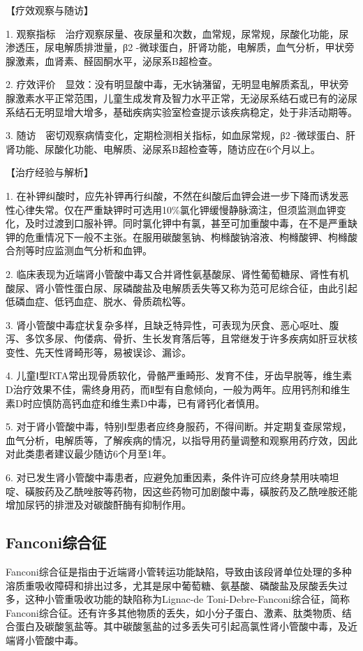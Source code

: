 【疗效观察与随访】

1.
观察指标　治疗观察尿量、夜尿量和次数，血常规，尿常规，尿酸化功能，尿渗透压，尿电解质排泄量，β{2}
-微球蛋白，肝肾功能，电解质，血气分析，甲状旁腺激素，血肾素、醛固酮水平，泌尿系B超检查。

2.
疗效评价　显效：没有明显酸中毒，无水钠潴留，无明显电解质紊乱，甲状旁腺激素水平正常范围，儿童生成发育及智力水平正常，无泌尿系结石或已有的泌尿系结石无明显增大增多，基础疾病实验室检查提示该疾病稳定，处于非活动期等。

3. 随访　密切观察病情变化，定期检测相关指标，如血尿常规，β{2}
-微球蛋白、肝肾功能、尿酸化功能、电解质、泌尿系B超检查等，随访应在6个月以上。

【治疗经验与解析】

1.
在补钾纠酸时，应先补钾再行纠酸，不然在纠酸后血钾会进一步下降而诱发恶性心律失常。仅在严重缺钾时可选用10\%氯化钾缓慢静脉滴注，但须监测血钾变化，及时过渡到口服补钾。同时氯化钾中有氯，甚至可加重酸中毒，在不是严重缺钾的危重情况下一般不主张。在服用碳酸氢钠、枸橼酸钠溶液、枸橼酸钾、枸橼酸合剂等时应监测血气分析和血钾。

2.
临床表现为近端肾小管酸中毒又合并肾性氨基酸尿、肾性葡萄糖尿、肾性有机酸尿、肾小管性蛋白尿、尿磷酸盐及电解质丢失等又称为范可尼综合征，由此引起低磷血症、低钙血症、脱水、骨质疏松等。

3.
肾小管酸中毒症状复杂多样，且缺乏特异性，可表现为厌食、恶心呕吐、腹泻、多饮多尿、佝偻病、骨折、生长发育落后等，且常继发于许多疾病如肝豆状核变性、先天性肾畸形等，易被误诊、漏诊。

4.
儿童Ⅰ型RTA常出现骨质软化，骨骼严重畸形、发育不佳，牙齿早脱等，维生素D治疗效果不佳，需终身用药，而Ⅱ型有自愈倾向，一般为两年。应用钙剂和维生素D时应慎防高钙血症和维生素D中毒，已有肾钙化者慎用。

5.
对于肾小管酸中毒，特别Ⅰ型患者应终身服药，不得间断。并定期复查尿常规，血气分析，电解质等，了解疾病的情况，以指导用药量调整和观察用药疗效，因此对此类患者建议最少随访6个月至1年。

6.
对已发生肾小管酸中毒患者，应避免加重因素，条件许可应终身禁用呋喃坦啶、磺胺药及乙酰唑胺等药物，因这些药物可加剧酸中毒，磺胺药及乙酰唑胺还能增加尿钙的排泄及对碳酸酐酶有抑制作用。

\subsection{Fanconi综合征}

Fanconi综合征是指由于近端肾小管转运功能缺陷，导致由该段肾单位处理的多种溶质重吸收障碍和排出过多，尤其是尿中葡萄糖、氨基酸、磷酸盐及尿酸丢失过多，这种小管重吸收功能的缺陷称为Lignac-de
Toni-Debre-Fanconi综合征，简称Fanconi综合征。还有许多其他物质的丢失，如小分子蛋白、激素、肽类物质、结合蛋白及碳酸氢盐等。其中碳酸氢盐的过多丢失可引起高氯性肾小管酸中毒，及近端肾小管酸中毒。

